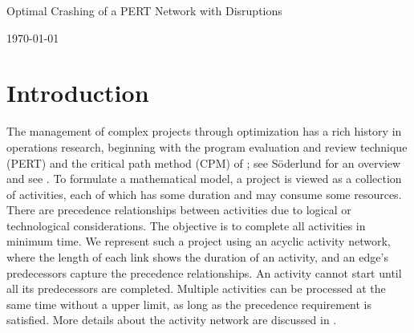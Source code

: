 \documentclass[11pt]{article}
\newcommand{\ms}{\medskip}
\begin{document}
\baselineskip0.25in

\begin{center}
\begin{large}
\begin{bf}

Optimal Crashing of a PERT Network with Disruptions \ms

\today \ms
\end{bf}
\end{large}
\end{center}

\section{Introduction} \label{sec:introduction}
	The management of complex projects through optimization has a rich history in operations research, beginning with the program evaluation and review technique (PERT) \cite{malcolm1959application} and the critical path method (CPM) of \cite{kelley1961criticalpath}; see S{\"o}derlund \cite{soderlund2004building} for an overview and see \cite{Elmaghraby77}. To formulate a mathematical model, a project is viewed as a collection of activities, each of which has some duration and may consume some resources. There are precedence relationships between activities due to logical or technological considerations. The objective is to complete all activities in minimum time. We represent such a project using an acyclic activity network, where the length of each link shows the duration of an activity, and an edge's predecessors capture the precedence relationships. An activity cannot start until all its predecessors are completed. Multiple activities can be processed at the same time without a upper limit, as long as the precedence requirement is satisfied. More details about the activity network are discussed in \cite{Elmaghraby77}.\\
	\newline 
\end{document}
